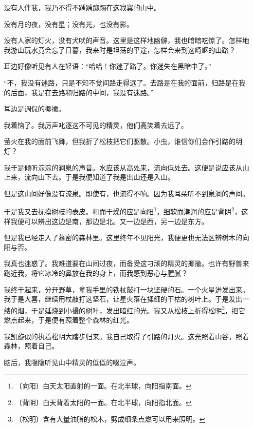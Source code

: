 \documentclass[12pt,UTF-8,openany]{ctexbook}
\begin{document}
\begin{large}
    
    没有人伴我，我乃不得不踽踽踯躅在这寂寞的山中。
    
    没有月的夜，没有星；没有光，也没有影。
    
    没有人家的灯火，没有犬吠的声音。这里是这样地幽僻，我也暗暗吃惊了。怎样地我游山玩水竟会忘了日暮，我来时是坦荡的平途，怎样会来到这崎岖的山路？
    
    耳边好像听见有人在轻语：“哈哈！你迷了路了。你迷失在黑暗中了。”
    
    “不，我没有迷路，只是不知不觉间路走得远了。去路是在我的面前，归路是在我的后面，我是在去路和归路的中间，我没有迷路。”
    
    耳边是调侃的揶揄。
    
    我着恼了。我厉声叱逐这不可见的精灵，他们高笑着去远了。
    
    萤火在我的面前飞舞，但我折了松枝把它们驱散。小虫，谁信你们会作引路的明灯？
    
    我于是倾听淙淙的涧泉的声音。水应该从高处来，流向低处去。这便是说应该从山上来，流向山下去。于是我便知道了我是出山还是入山。
    
    但是这山间好像没有流泉。即使有，也流得不响。因为我耳朵听不到泉涧的声间。
    
    于是我又去抚摸树枝的表皮。粗而干燥的应是向阳\footnote{〔向阳〕白天太阳直射的一面。在北半球，向阳指南面。}，细软而潮润的应是背阴\footnote{〔背阴〕白天背着太阳的一面。在北半球，向阳指北面。}，这样我便可以辨出这边是南，那边是北。又一边是西，另一边是东方。
    
    但是我已经走入了蓊密的森林里。这里终年不见阳光，我便更也无法区辨树木的向阳与否。
    
    我真也迷惑了。我难道要在山间过夜，而备受这刁顽的精灵的揶揄。也许有野兽来跑近我，将它冰冷的鼻放在我的身上，而我感到恶心与腥腻？
    
    我终于起来，分开野草，拿我手里的铁杖敲打一块坚硬的石。一个火星迸发出来。我于是大喜，继续用杖敲打这坚石，让星火落在揉细的干枯的树叶上。于是发出一缕的烟，于是延烧到小撮的树叶，发出暗红的光。我又从松枝上折得松明\footnote{〔松明〕含有大量油脂的松木，劈成细条点燃可以用来照明。}，把它燃点起来，于是便有照着整个森林的红光。
    
    我凯旋似的执着松明大踏步归来。我自己取得了引路的灯火。这光照着山谷，照着森林，照着自己。
    
    脑后，我隐隐听见山中精灵的低低的啜泣声。
    
\end{large}
\end{document}
